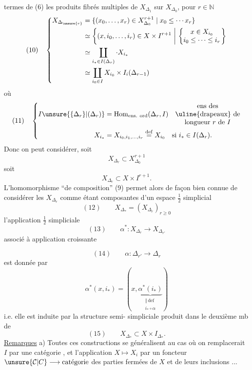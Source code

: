 termes de (6) les produits fibrés
multiples de $X_{\Delta_1}$ sur $X_{\Delta_0}$, pour $r\in\mathbb N$
\[
(10)\quad\left\{\begin{aligned}
X_{\Delta_{\unsure{r}}}&=\{(x_0,\ldots,x_r)\in X_{\Delta_0}^{r+1}\mid x_0\leq\cdots x_r\}\\
&\simeq\left\{(x,i_0,\ldots,i_r)\in X\times I^{r+1}\ \middle|\ \left\{\begin{matrix}x\in X_{i_0}\\i_0\leq\cdots\leq i_r\end{matrix}\right.\right\}\\
&\simeq\coprod_{i_*\in I(\Delta_r)}\cdot X_{i_*}\\
&\simeq\coprod_{i_0\in I}X_{i_0}\times I_i(\Delta_{r-1})
\end{aligned}\right.
\]
où
\[
(11)\quad\left\{\begin{aligned}
I\unsure{\{\Delta_r\}|(\Delta_r)}&=\operatorname{Hom}_{\text{ens. ord}}(\Delta_r,I)
\quad\begin{matrix}\text{ens des}\\\text{\uline{drapeaux} de}\\\text{longueur }r\text{ de }I\end{matrix}\\
X_{i_*}&=X_{i_0,i_1,\ldots,i_r}\overset{\mathrm{def}}{=}X_{i_0}\quad\text{si }i_*\in I(\Delta_r).
\end{aligned}\right.
\]
Donc on peut considérer, soit
\[
X_{\Delta_r}\subset X_{\Delta_0}^{r+1}
\]
soit
\[
X_{\Delta_r}\subset X\times I^{r+1}.
\]
L'homomorphisme ``de composition'' (9)
permet alors de façon bien connue de
considérer les $X_{\Delta_r}$ comme étant 
composantes d'un espace $\frac12$ simplicial
\[
(12)\qquad X_{\Delta_*}=(X_{\Delta_r})_{r\geq0}
\]
 l'application $\frac12$ simpliciale
\[
(13)\qquad\alpha^*:X_{\Delta_r}\longrightarrow X_{\Delta_{r'}}
\]
associé à  application croissante

\[
(14)\qquad\alpha:\Delta_{r'}\longrightarrow\Delta_r
\]
est donnée par
\[
\alpha^*(x,i_*)=(x,\underbrace{\alpha^*(i_*)}_{\substack{\Vert\,\mathrm{def}\\i_*\circ\alpha}})
\]
i.e. elle est induite par la structure semi-
simpliciale produit dans le deuxième mb de
\[
(15)\qquad X_{\Delta_*}\subset X\times I_{\Delta_*}.
\]
\uline{Remarques} a) Toutes ces constructions se généralisent au
cas où on remplacerait  $I$ par une catégorie , et
l'application $X\mapsto X_i$ par un foncteur $\unsure{\mathcal{C}|C}\longrightarrow\text{catégorie}$
des parties fermées de $X$ et de leurs inclusions
...

